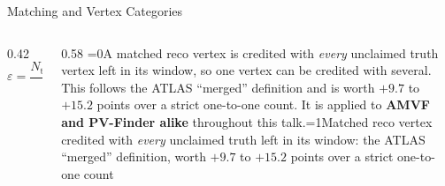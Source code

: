 \documentclass[xcolor=table,aspectratio=169]{beamer}
\newcommand{\ntrk}{\ensuremath{n_\mathrm{trk}}}
\providecommand{\talkbuild}{0}
\newcommand{\readingonly}[1]{\ifnum\talkbuild=0\relax#1\fi}
\newcommand{\talkonly}[1]{\ifnum\talkbuild=1\relax#1\fi}
\begin{document}
\begin{frame}{Matching and Vertex Categories}
    \vspace{0.45em}
    \begin{columns}[c]
        \begin{column}{0.42\linewidth}
            \centering
            \footnotesize
            \[\varepsilon = \frac{N_\text{truth clean}+N_\text{truth merged}}{N_\text{truth}}
              \qquad (\ntrk\geq2)\]
        \end{column}
        \begin{column}{0.58\linewidth}
            {\footnotesize\textcolor{black!65}{\readingonly{A matched reco vertex is credited with
            \emph{every} unclaimed truth vertex left in its window, so one
            vertex can be credited with several. This follows the ATLAS ``merged''
            definition and is worth $+9.7$ to $+15.2$ points over a strict one-to-one
            count. It is applied to \textbf{AMVF and PV-Finder alike}
            throughout this talk.}\talkonly{Matched reco vertex credited with
            \emph{every} unclaimed truth left in its window: the ATLAS ``merged''
            definition, worth $+9.7$ to $+15.2$ points over a strict one-to-one
            count}}}
        \end{column}
    \end{columns}
\end{frame}
\end{document}
